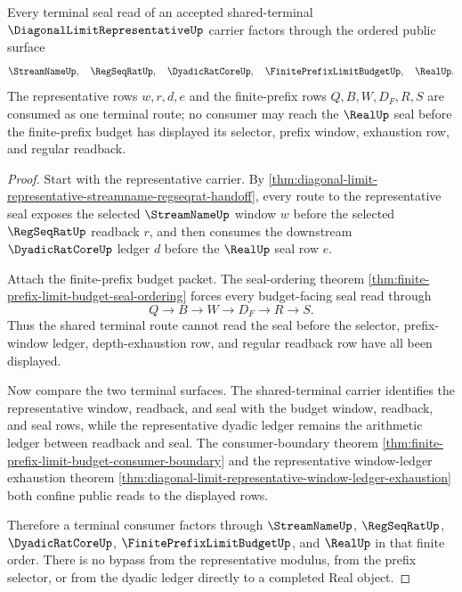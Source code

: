 \begin{theorem}
\label{thm:diagonal-limit-representative-shared-terminal-route}
Every terminal seal read of an accepted shared-terminal $\DiagonalLimitRepresentativeUp$ carrier factors through the ordered public surface
$$
\StreamNameUp,\quad \RegSeqRatUp,\quad \DyadicRatCoreUp,\quad \FinitePrefixLimitBudgetUp,\quad \RealUp.
$$
The representative rows $w,r,d,e$ and the finite-prefix rows $Q,B,W,D_F,R,S$ are consumed as one terminal route; no consumer may reach the $\RealUp$ seal before the finite-prefix budget has displayed its selector, prefix window, exhaustion row, and regular readback.
\end{theorem}
\begin{proof}
Start with the representative carrier. By \autoref{thm:diagonal-limit-representative-streamname-regseqrat-handoff}, every route to the representative seal exposes the selected $\StreamNameUp$ window $w$ before the selected $\RegSeqRatUp$ readback $r$, and then consumes the downstream $\DyadicRatCoreUp$ ledger $d$ before the $\RealUp$ seal row $e$.

Attach the finite-prefix budget packet. The seal-ordering theorem \autoref{thm:finite-prefix-limit-budget-seal-ordering} forces every budget-facing seal read through
$$
Q \to B \to W \to D_F \to R \to S.
$$
Thus the shared terminal route cannot read the seal before the selector, prefix-window ledger, depth-exhaustion row, and regular readback row have all been displayed.

Now compare the two terminal surfaces. The shared-terminal carrier identifies the representative window, readback, and seal with the budget window, readback, and seal rows, while the representative dyadic ledger remains the arithmetic ledger between readback and seal. The consumer-boundary theorem \autoref{thm:finite-prefix-limit-budget-consumer-boundary} and the representative window-ledger exhaustion theorem \autoref{thm:diagonal-limit-representative-window-ledger-exhaustion} both confine public reads to the displayed rows.

Therefore a terminal consumer factors through $\StreamNameUp$, $\RegSeqRatUp$, $\DyadicRatCoreUp$, $\FinitePrefixLimitBudgetUp$, and $\RealUp$ in that finite order. There is no bypass from the representative modulus, from the prefix selector, or from the dyadic ledger directly to a completed Real object.
\end{proof}

